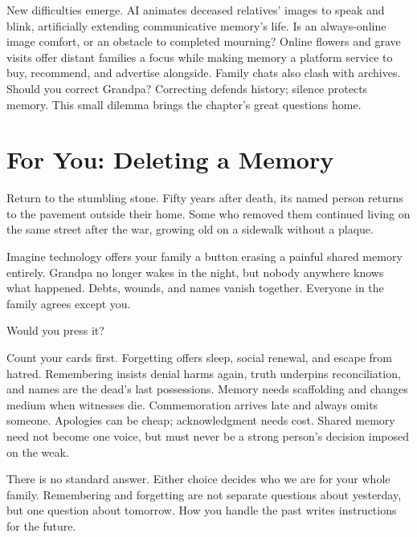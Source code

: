New difficulties emerge. AI animates deceased relatives' images to speak and blink, artificially extending communicative memory's life. Is an always-online image comfort, or an obstacle to completed mourning? Online flowers and grave visits offer distant families a focus while making memory a platform service to buy, recommend, and advertise alongside. Family chats also clash with archives. Should you correct Grandpa? Correcting defends history; silence protects memory. This small dilemma brings the chapter's great questions home.

\section{For You: Deleting a Memory}
Return to the stumbling stone. Fifty years after death, its named person returns to the pavement outside their home. Some who removed them continued living on the same street after the war, growing old on a sidewalk without a plaque.

Imagine technology offers your family a button erasing a painful shared memory entirely. Grandpa no longer wakes in the night, but nobody anywhere knows what happened. Debts, wounds, and names vanish together. Everyone in the family agrees except you.

Would you press it?

Count your cards first. Forgetting offers sleep, social renewal, and escape from hatred. Remembering insists denial harms again, truth underpins reconciliation, and names are the dead's last possessions. Memory needs scaffolding and changes medium when witnesses die. Commemoration arrives late and always omits someone. Apologies can be cheap; acknowledgment needs cost. Shared memory need not become one voice, but must never be a strong person's decision imposed on the weak.

There is no standard answer. Either choice decides who we are for your whole family. Remembering and forgetting are not separate questions about yesterday, but one question about tomorrow. How you handle the past writes instructions for the future.
